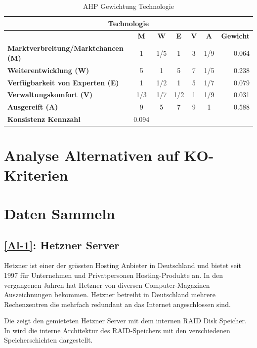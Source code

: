 \begin{table}[htbp]
\caption{AHP Gewichtung Technologie}
\begin{tabular}{|l|c|c|c|c|c|r|}
\hline
\multicolumn{ 7}{|c|}{\textbf{Technologie}} \\ \hline
 & \textbf{M} & \textbf{W} & \textbf{E} & \textbf{V} & \textbf{A} & \multicolumn{1}{l|}{\textbf{Gewicht}} \\ \hline
\textbf{Marktverbreitung/Marktchancen (M)} & 1 & 1/5 & 1 & 3 & 1/9 & 0.064 \\ \hline
\textbf{Weiterentwicklung (W)} & 5 & 1 & 5 & 7 & 1/5 & 0.238 \\ \hline
\textbf{Verfügbarkeit von Experten (E)} & 1 & 1/2 & 1 & 5 & 1/7 & 0.079 \\ \hline
\textbf{Verwaltungskomfort (V)} & 1/3 & 1/7 & 1/2 & 1 & 1/9 & 0.031 \\ \hline
\textbf{Ausgereift (A)} & 9 & 5 & 7 & 9 & 1 & 0.588 \\ \hline
\textbf{Konsistenz Kennzahl} & \multicolumn{1}{r|}{0.094} \\ \cline{1-2}
\end{tabular}
\label{tab:AHPTechnologie}
\end{table}


\section{Analyse Alternativen auf KO-Kriterien}

\section{Daten Sammeln}
\subsection{\ref{Al-1}: Hetzner Server}
Hetzner ist einer der grössten Hosting Anbieter in Deutschland und bietet seit 1997 für Unternehmen und Privatpersonen Hosting-Produkte an. In den vergangenen Jahren hat Hetzner von diversen Computer-Magazinen Auszeichnungen bekommen. Hetzner betreibt in Deutschland mehrere Rechenzentren die mehrfach redundant an das Internet angeschlossen sind.

Die  zeigt den gemieteten Hetzner Server mit dem internen RAID Disk Speicher. In  wird die interne Architektur des RAID-Speichers mit den verschiedenen Speicherschichten dargestellt.

